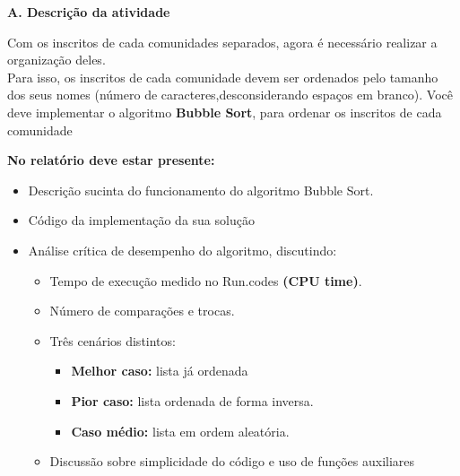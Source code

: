 
\vspace{0.5cm} %

\noindent\parbox{\linewidth}{
    {\color{titleblue}\LARGE\bfseries A. Descrição da atividade}
    \vspace{2mm} %
    
}

\bigskip %

Com os inscritos de cada comunidades separados, agora é necessário realizar a organização deles. \\
Para isso, os inscritos de cada comunidade devem ser ordenados pelo tamanho dos seus nomes (número de caracteres,desconsiderando espaços em branco). 
Você deve implementar o algoritmo \textbf{Bubble Sort}, para ordenar os inscritos de cada comunidade

\medskip %

\noindent\textbf{No relatório deve estar presente:}
\begin{itemize}
    \setlength\itemsep{0.2em} %
    \item Descrição sucinta do funcionamento do algoritmo Bubble Sort.
    \item Código da implementação da sua solução
    \item Análise crítica de desempenho do algoritmo, discutindo:
    \begin{itemize}
        \item Tempo de execução medido no Run.codes \textbf{(CPU time)}.
        \item Número de comparações e trocas.
        \item Três cenários distintos:
        \begin{itemize}
            \item \textbf{Melhor caso:} lista já ordenada
            \item \textbf{Pior caso:} lista ordenada de forma inversa.
            \item \textbf{Caso médio:} lista em ordem aleatória.
        \end{itemize}
        \item Discussão sobre simplicidade do código e uso de funções auxiliares
    \end{itemize}
\end{itemize}

